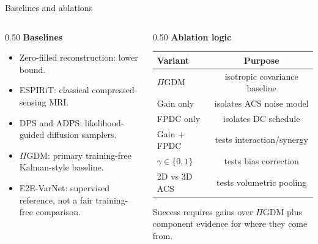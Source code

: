 \documentclass[aspectratio=169]{beamer}
\newcommand{\PIGDM}{$\Pi$GDM}
\begin{document}
\begin{frame}{Baselines and ablations}
  \small
  \begin{columns}[T]
    \begin{column}{0.50\textwidth}
      \textbf{Baselines}
      \begin{itemize}
        \item Zero-filled reconstruction: lower bound.
        \item ESPIRiT: classical compressed-sensing MRI.
        \item DPS and ADPS: likelihood-guided diffusion samplers.
        \item \PIGDM{}: primary training-free Kalman-style baseline.
        \item E2E-VarNet: supervised reference, not a fair training-free comparison.
      \end{itemize}
    \end{column}
    \begin{column}{0.50\textwidth}
      \textbf{Ablation logic}
      \begin{center}
      \scriptsize
      \begin{tabular}{@{}l c@{}}
        \toprule
        Variant & Purpose \\
        \midrule
        \PIGDM{} & isotropic covariance baseline \\
        Gain only & isolates ACS noise model \\
        FPDC only & isolates DC schedule \\
        Gain + FPDC & tests interaction/synergy \\
        $\gamma\in\{0,1\}$ & tests bias correction \\
        2D vs 3D ACS & tests volumetric pooling \\
        \bottomrule
      \end{tabular}
      \end{center}
      \vspace{0.2em}
      \footnotesize
      Success requires gains over \PIGDM{} plus component evidence for where they come from.
    \end{column}
  \end{columns}
\end{frame}
\end{document}
